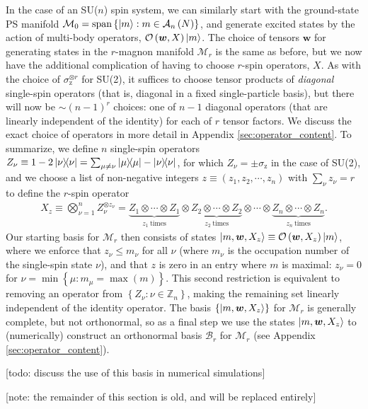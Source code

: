 \documentclass[nofootinbib,notitlepage,11pt]{revtex4-2}
\renewcommand{\t}{\text} %
\newcommand{\p}[1]{\left(#1\right)} %
\renewcommand{\set}[1]{\left\{#1\right\}} %
\newcommand{\m}{\bm} %
\newcommand{\1}{\mathds{1}}
\newcommand{\z}{\text{z}}
\newcommand{\A}{\mathcal{A}}
\newcommand{\B}{\mathcal{B}}
\newcommand{\M}{\mathcal{M}}
\renewcommand{\O}{\mathcal{O}}
\newcommand{\ZZ}{\mathbb{Z}}
\newcommand{\oper}{\operatorname}
\newcommand{\red}[1]{{\color{red} #1}}
\begin{document}
In the case of an SU($n$) spin system, we can similarly start with the
ground-state PS manifold
$\M_0=\oper{span}\set{\ket{m}:m\in\A_n\p{N}}$, and generate excited
states by the action of multi-body operators, $\O\p{\m w,X}\ket{m}$.
The choice of tensors $\m w$ for generating states in the $r$-magnon
manifold $\M_r$ is the same as before, but we now have the additional
complication of having to choose $r$-spin operators, $X$.  As with the
choice of $\sigma_\z^{\otimes r}$ for SU(2), it suffices to choose
tensor products of {\it diagonal} single-spin operators (that is,
diagonal in a fixed single-particle basis), but there will now be
$\sim\p{n-1}^r$ choices: one of $n-1$ diagonal operators (that are
linearly independent of the identity) for each of $r$ tensor factors.
We discuss the exact choice of operators in more detail in Appendix
\ref{sec:operator_content}.  To summarize, we define $n$ single-spin
operators $Z_\nu\equiv1-2\op\nu=\sum_{\mu\ne\nu}\op\mu-\op\nu$, for
which $Z_\nu=\pm\sigma_\z$ in the case of SU(2), and we choose a list
of non-negative integers $z\equiv\p{z_1,z_2,\cdots,z_n}$ with
$\sum_\nu z_\nu=r$ to define the $r$-spin operator
\begin{align}
  X_z \equiv \bigotimes_{\nu=1}^n Z_\nu^{\otimes z_\nu}
  = \underbrace{Z_1 \otimes \cdots \otimes Z_1}_{z_1~\t{times}}
  \otimes
  \underbrace{Z_2 \otimes \cdots \otimes Z_2}_{z_2~\t{times}}
  \otimes \cdots \otimes
  \underbrace{Z_n \otimes \cdots \otimes Z_n}_{z_n~\t{times}}.
\end{align}
Our starting basis for $\M_r$ then consists of states
$\ket{m,\m w,X_z}\equiv\O\p{\m w,X_z}\ket{m}$, where we enforce that
$z_\nu\le m_\nu$ for all $\nu$ (where $m_\nu$ is the occupation number
of the single-spin state $\nu$), and that $z$ is zero in an entry
where $m$ is maximal: $z_\nu=0$ for
$\nu=\min\set{\mu:m_\mu=\max\p{m}}$.  This second restriction is
equivalent to removing an operator from $\set{Z_\nu:\nu\in\ZZ_n}$,
making the remaining set linearly independent of the identity
operator.  The basis $\set{\ket{m,\m w,X_z}}$ for $\M_r$ is generally
complete, but not orthonormal, so as a final step we use the states
$\ket{m,\m w,X_z}$ to (numerically) construct an orthonormal basis
$\B_r$ for $\M_r$ (see Appendix \ref{sec:operator_content}).



\red{[todo: discuss the use of this basis in numerical simulations]}



\newpage

\red{[note: the remainder of this section is old, and will be replaced
  entirely]}
\end{document}
